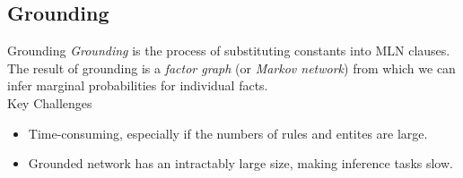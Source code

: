 \documentclass[onlymath,xcolor=pdftex,dvipsnames,table]{beamer}
\let\oldemph\emph
\renewcommand{\emph}[1]{{\color{Blue}\oldemph{#1}}}
\newcommand{\head}[1]{{\large\color{OliveGreen}#1\\[2pt]}}
\begin{document}
\subsection{Grounding}
\begin{frame}{Grounding}
\emph{Grounding} is the process of substituting constants into MLN
clauses.\\[5pt]

The result of grounding is a \emph{factor graph} (or \emph{Markov
  network}) from which we can infer marginal probabilities for
individual facts.\\[15pt]

\head{Key Challenges}
\begin{itemize}
  \item Time-consuming, especially if the numbers of rules and entites
    are large.
  \item Grounded network has an intractably large size, making inference
    tasks slow.
\end{itemize}
\end{frame}
\end{document}
